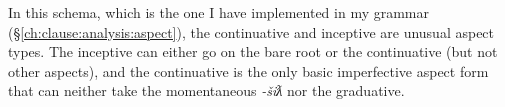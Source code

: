 \begin{comment}
\begin{tikzpicture}[sibling distance=10em,
  every node/.style = {shape=rectangle, align=center}]
\node (root) at (8,4.5) {Root};
\node (mo) at (2,2) {Momentaneous (8)};
\node (ct) at (8,2) {Continuative (13)};
\node (dr) at (10.5,2) {Durative (1)};
\node (rp) at (13,2) {Repetitive (6)};
\node (it) at (15,2) {Iterative (11)};
\node (in) at (4.5,2) {Inceptive (2)};
\node (mo-grad) at (2,0) {Moment.-Grad. (9)};
\node (in-grad) at (5,0) {Incept.-Grad. (3)};
\node (mo-grad-pf) at (2,-2) {Mom.-Grad.-Mom. (10)};
\node (in-grad-pf) at (5,-2) {Inc.-Grad.-Mom. (4)};
\node (dr-pf) at (7.5,-2) {Dur.-Mom. (14)};
\node (rp-pf) at (10,-2) {Repet.-Mom. (7)};
\node (it-pf) at (12.5,-2) {Iter.-Mom. (12)};
\node (it-pf2) at (15,-2) {Iter.-Mom. 2 (5)};
\draw[->] (root) -- (mo) node[midway,fill=white] {-šiƛ};
\draw[->] (root) -- (ct) node[midway,fill=white] {-(y)aˑ};
\draw[->] (root) -- (in) node[midway, fill=white] {-iˑčiƛ};
\draw[->] (root) -- (dr) node[midway,fill=white] {-uk};
\draw[->] (root) -- (rp) node[midway,fill=white] {-LR2L.a};
\draw[->] (root) -- (it) node[midway,fill=white, right] {-LR2L.š};
\draw[->] (mo) -- (mo-grad) node[near start,fill=lightgray] {-LS};
\draw[->] (in) -- (in-grad) node[near start,fill=lightgray] {-LS};
\draw[->] (mo-grad) -- (mo-grad-pf) node[near start,fill=white] {-šiƛ};
\draw[->] (in-grad) -- (in-grad-pf) node[near start,fill=white] {-šiƛ};
\draw[->] (ct) -- (in) node[midway,above right] {-iˑčiƛ};
\draw[->] (dr) -- (dr-pf) node[midway,fill=white] {-šiƛ};
\draw[->] (rp) -- (rp-pf) node[midway,fill=white] {-šiƛ};
\draw[->] (it) -- (it-pf) node[midway,fill=white] {-šiƛ};
\draw[->] (it) -- (it-pf2) node[midway,fill=white] {-iił};
\begin{scope}[on background layer]
\node[draw=none, fit=(ct)(dr)(it), fill=white] (impf) {};
\node[above left] at (impf.north east) {\textit{imperfective}};
\node[bigbox, fit=(mo)(in), fill=lightgray] (perf) {};
\node[below right] at (perf.north west) {\textit{perfective}};
\node[bigbox, fit=(mo-grad-pf)(it-pf)(it-pf2), fill=lightgray] (perf2) {};
\node[below right] at (perf2.north west) {\textit{perfective}};
\end{scope}
\end{tikzpicture}	
\end{comment}


In this schema, which is the one I have implemented in my grammar (\S\ref{ch:clause:analysis:aspect}), the continuative and inceptive are unusual aspect types. The inceptive can either go on the bare root or the continuative (but not other aspects), and the continuative is the only basic imperfective aspect form that can neither take the momentaneous \textit{-šiƛ} nor the graduative.

